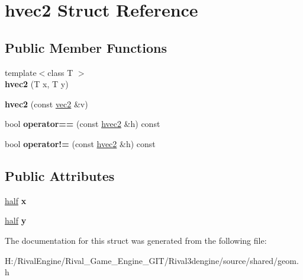 \hypertarget{structhvec2}{}\section{hvec2 Struct Reference}
\label{structhvec2}
\subsection*{Public Member Functions}
\begin{DoxyCompactItemize}
\item 
\mbox{\label{structhvec2_a883b7e3fbd94e228f77e850285b530b2}} 
{\footnotesize template$<$class T $>$ }\\{\bfseries hvec2} (T x, T y)
\item 
\mbox{\label{structhvec2_a9f6a5ffe185884df529de979bf500c2e}} 
{\bfseries hvec2} (const \hyperlink{structvec2}{vec2} \&v)
\item 
\mbox{\label{structhvec2_a73e3c8a3fcd2fcc222474c11247c2b82}} 
bool {\bfseries operator==} (const \hyperlink{structhvec2}{hvec2} \&h) const
\item 
\mbox{\label{structhvec2_a5f48efd2c5e3e8e849f4e9b4831c1b43}} 
bool {\bfseries operator!=} (const \hyperlink{structhvec2}{hvec2} \&h) const
\end{DoxyCompactItemize}
\subsection*{Public Attributes}
\begin{DoxyCompactItemize}
\item 
\mbox{\label{structhvec2_aecc105cd988f8bf1aeac2a1b74b051cd}} 
\hyperlink{structhalf}{half} {\bfseries x}
\item 
\mbox{\label{structhvec2_a6f7c34724f31ba004fef6f5eecca972f}} 
\hyperlink{structhalf}{half} {\bfseries y}
\end{DoxyCompactItemize}


The documentation for this struct was generated from the following file\+:\begin{DoxyCompactItemize}
\item 
H\+:/\+Rival\+Engine/\+Rival\+\_\+\+Game\+\_\+\+Engine\+\_\+\+G\+I\+T/\+Rival3dengine/source/shared/geom.\+h\end{DoxyCompactItemize}
